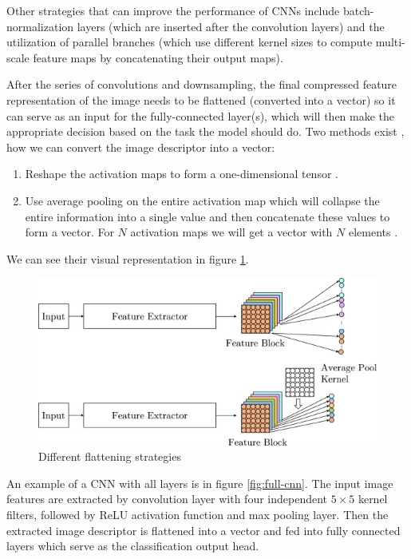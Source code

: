 Other strategies that can improve the performance of CNNs include batch-normalization layers \cite{Ioffe2015}(which are inserted after the convolution layers) and the utilization of parallel branches \cite{Szegedy2015} (which use different kernel sizes to compute multi-scale feature maps by concatenating their output maps).

After the series of convolutions and downsampling, the final compressed feature representation of the image needs to be flattened (converted into a vector) so it can serve as an input for the fully-connected layer(s), which will then make the appropriate decision based on the task the model should do. Two methods exist \cite{Santosh2022-2}, how we can convert the image descriptor into a vector:

\begin{enumerate}
    \item Reshape the activation maps to form a one-dimensional tensor \cite{Krizhevsky2012, LeCun2015-2}.
    \item Use average pooling on the entire activation map which will collapse the entire information into a single value and then concatenate these values to form a vector. For $N$ activation maps we will get a vector with $N$ elements \cite{He2016, Szegedy2015}.
\end{enumerate}

We can see their visual representation in figure \ref{fig:flatenning}.

\begin{figure}[H]
\begin{centering}
\includegraphics[width=12cm]{assets/images/flattening.jpg}
\par\end{centering}
\caption{Different flattening strategies \cite{Santosh2022-2}}
\label{fig:flatenning}
\end{figure}

An example of a CNN with all layers is in figure \ref{fig:full-cnn}. The input image features are extracted by convolution layer with four independent $5\times5$ kernel filters, followed by ReLU activation function and max pooling layer. Then the extracted image descriptor is flattened into a vector and fed into fully connected layers which serve as the classification output head.

